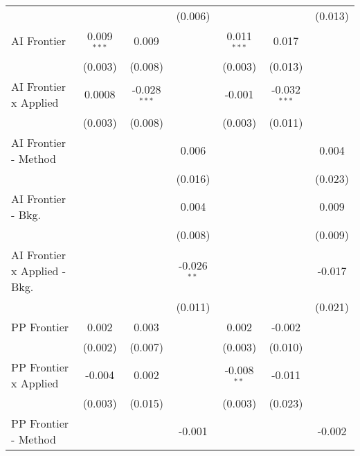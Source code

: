 \begin{tabular}{lcccccc}
                                  &               &                & (0.006)       &               &                & (0.013)\\   
   AI Frontier                    & 0.009$^{***}$ & 0.009          &               & 0.011$^{***}$ & 0.017          &   \\   
                                  & (0.003)       & (0.008)        &               & (0.003)       & (0.013)        &   \\   
   AI Frontier x Applied          & 0.0008        & -0.028$^{***}$ &               & -0.001        & -0.032$^{***}$ &   \\   
                                  & (0.003)       & (0.008)        &               & (0.003)       & (0.011)        &   \\   
   AI Frontier - Method           &               &                & 0.006         &               &                & 0.004\\   
                                  &               &                & (0.016)       &               &                & (0.023)\\   
   AI Frontier - Bkg.             &               &                & 0.004         &               &                & 0.009\\   
                                  &               &                & (0.008)       &               &                & (0.009)\\   
   AI Frontier x Applied - Bkg.   &               &                & -0.026$^{**}$ &               &                & -0.017\\   
                                  &               &                & (0.011)       &               &                & (0.021)\\   
   PP Frontier                    & 0.002         & 0.003          &               & 0.002         & -0.002         &   \\   
                                  & (0.002)       & (0.007)        &               & (0.003)       & (0.010)        &   \\   
   PP Frontier x Applied          & -0.004        & 0.002          &               & -0.008$^{**}$ & -0.011         &   \\   
                                  & (0.003)       & (0.015)        &               & (0.003)       & (0.023)        &   \\   
   PP Frontier - Method           &               &                & -0.001        &               &                & -0.002\\   

\end{tabular}
